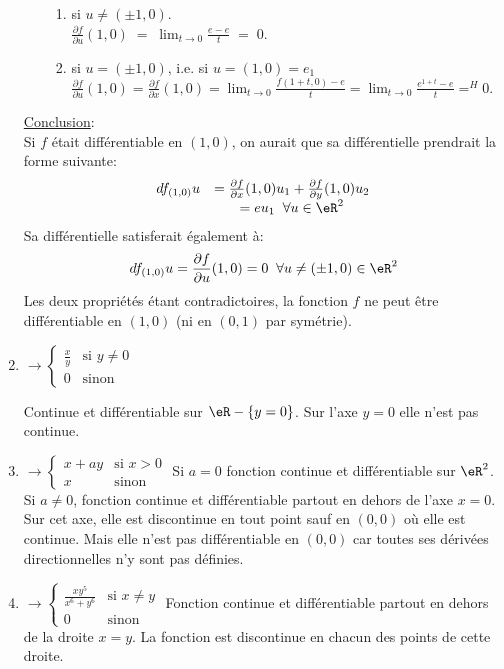 \begin{enumerate}
\begin{enumerate}
		            \begin{enumerate}
			            \item si $u\neq(\pm1,0)$.\\
			                  $\frac{ \partial f }{ \partial u }(1,0) \;=\;\lim_{t\rightarrow 0}\frac{e-e}{t}\;=\;0$.
			            \item si $u=(\pm1,0)$, i.e. si $u=(1,0) = e_1$\\
			                  $\frac{ \partial f }{ \partial u }(1,0) = \frac{ \partial f }{ \partial x }(1,0)=\lim_{t\rightarrow 0}\frac{f(1+t,0)-e}{t}=\lim_{t\rightarrow 0}\frac{e^{1+t}-e}{t} =^H0$.
		            \end{enumerate}
	      \end{enumerate}
	      \underline{Conclusion}:\\
	      Si $f$ était différentiable en $(1,0)$, on aurait que sa différentielle prendrait la forme suivante:
	      \[\begin{array}{cc} df_{(1,0)}u & = \frac{ \partial f }{ \partial x }(1,0)u_1+\frac{ \partial f }{ \partial y }(1,0)u_2 \\
                              & = eu_1\;\;\forall u\in\eR^2\end{array} \]
	      Sa différentielle satisferait également à:
	      \[  df_{(1,0)}u = \frac{ \partial f }{ \partial u }(1,0) = 0 \;\; \forall u \neq (\pm1,0) \in \eR^2\]
	      Les deux propriétés étant contradictoires, la fonction $f$ ne peut être différentiable en $(1,0)$ (ni en $(0,1)$ par symétrie).

	\item \( \rightarrow  \begin{cases}
		      \frac{ x }{ y } & \text{si } y\neq 0 \\
		      0               & \text{sinon}
	      \end{cases}\)

	      Continue et différentiable sur $\eR-\{y=0\}$. Sur l'axe $y=0$ elle n'est pas continue.
	\item \( \rightarrow  \begin{cases}
		      x+ay & \text{si } x>0 \\
		      x    & \text{sinon}
	      \end{cases}\)
	      Si $a=0$ fonction continue et différentiable sur $\eR^2$. Si $a\neq0$, fonction continue et différentiable partout en dehors de l'axe $x=0$. Sur cet axe, elle est discontinue en tout point sauf en $(0,0)$ où elle est continue. Mais elle n'est pas différentiable en $(0,0)$ car toutes ses dérivées directionnelles  n'y sont pas définies.
	\item \(  \rightarrow\begin{cases}
		      \frac{ xy^5 }{ x^6+y^6 } & \text{si } x\neq y \\
		      0                        & \text{sinon}
	      \end{cases}\)
	      Fonction continue et différentiable partout en dehors de la droite $x=y$.  La fonction est discontinue en chacun des points de cette droite.

\end{enumerate}

